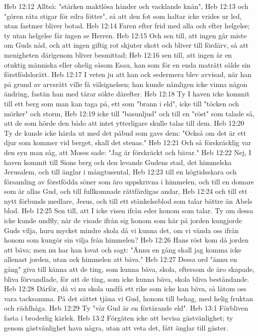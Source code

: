 Heb 12:12  Alltså: "stärken maktlösa händer och vacklande knän",
Heb 12:13  och "gören räta stigar för edra fötter", så att den fot som haltar icke vrides ur led, utan fastmer bliver botad.
Heb 12:14  Faren efter frid med alla och efter helgelse; ty utan helgelse får ingen se Herren.
Heb 12:15  Och sen till, att ingen går miste om Guds nåd, och att ingen giftig rot skjuter skott och bliver till fördärv, så att menigheten därigenom bliver besmittad;
Heb 12:16  sen till, att ingen är en otuktig människa eller ohelig såsom Esau, han som för en enda maträtt sålde sin förstfödslorätt.
Heb 12:17  I veten ju att han ock sedermera blev avvisad, när han på grund av arvsrätt ville få välsignelsen; han kunde nämligen icke vinna någon ändring, fastän han med tårar sökte därefter.
Heb 12:18  Ty I haven icke kommit till ett berg som man kan taga på, ett som "brann i eld", icke till "töcken och mörker" och storm,
Heb 12:19  icke till "basunljud" och till en "röst" som talade så, att de som hörde den bådo att intet ytterligare skulle talas till dem.
Heb 12:20  Ty de kunde icke härda ut med det påbud som gavs dem: "Också om det är ett djur som kommer vid berget, skall det stenas."
Heb 12:21  Och så förskräcklig var den syn man såg, att Moses sade: "Jag är förskräckt och bävar."
Heb 12:22  Nej, I haven kommit till Sions berg och den levande Gudens stad, det himmelska Jerusalem, och till änglar i mångtusental,
Heb 12:23  till en högtidsskara och församling av förstfödda söner som äro uppskrivna i himmelen, och till en domare som är allas Gud, och till fullkomnade rättfärdigas andar,
Heb 12:24  och till ett nytt förbunds medlare, Jesus, och till ett stänkelseblod som talar bättre än Abels blod.
Heb 12:25  Sen till, att I icke visen ifrån eder honom som talar. Ty om dessa icke kunde undfly, när de visade ifrån sig honom som här på jorden kungjorde Guds vilja, huru mycket mindre skola då vi kunna det, om vi vända oss ifrån honom som kungör sin vilja från himmelen?
Heb 12:26  Hans röst kom då jorden att bäva; men nu har han lovat och sagt: "Ännu en gång skall jag komma icke allenast jorden, utan ock himmelen att bäva."
Heb 12:27  Dessa ord "ännu en gång" giva till känna att de ting, som kunna bäva, skola, eftersom de äro skapade, bliva förvandlade, för att de ting, som icke kunna bäva, skola bliva beståndande.
Heb 12:28  Därför, då vi nu skola undfå ett rike som icke kan bäva, så låtom oss vara tacksamma. På det sättet tjäna vi Gud, honom till behag, med helig fruktan och räddhåga.
Heb 12:29  Ty "vår Gud är en förtärande eld".
Heb 13:1  Förbliven fasta i broderlig kärlek.
Heb 13:2  Förgäten icke att bevisa gästvänlighet; ty genom gästvänlighet hava några, utan att veta det, fått änglar till gäster.
